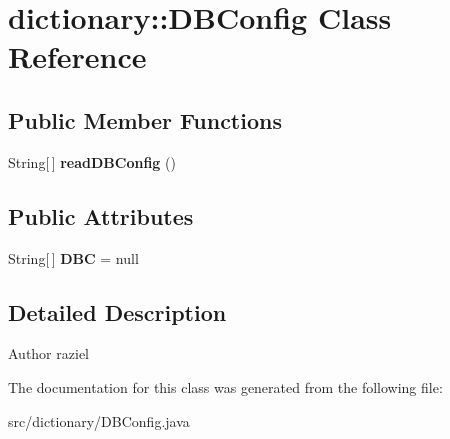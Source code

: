 \hypertarget{classdictionary_1_1_d_b_config}{
\section{dictionary::DBConfig Class Reference}
\label{classdictionary_1_1_d_b_config}
}
\subsection*{Public Member Functions}
\begin{DoxyCompactItemize}
\item 
\hypertarget{classdictionary_1_1_d_b_config_a119f9844247865c6c92bbe5e9e0a407a}{
String\mbox{[}$\,$\mbox{]} {\bfseries readDBConfig} ()}
\label{classdictionary_1_1_d_b_config_a119f9844247865c6c92bbe5e9e0a407a}

\end{DoxyCompactItemize}
\subsection*{Public Attributes}
\begin{DoxyCompactItemize}
\item 
\hypertarget{classdictionary_1_1_d_b_config_abe7ee28546c384279312485c25fec19e}{
String\mbox{[}$\,$\mbox{]} {\bfseries DBC} = null}
\label{classdictionary_1_1_d_b_config_abe7ee28546c384279312485c25fec19e}

\end{DoxyCompactItemize}


\subsection{Detailed Description}
\begin{DoxyAuthor}{Author}
raziel 
\end{DoxyAuthor}


The documentation for this class was generated from the following file:\begin{DoxyCompactItemize}
\item 
src/dictionary/DBConfig.java\end{DoxyCompactItemize}
